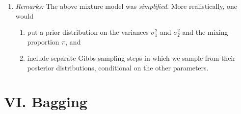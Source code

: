 \documentclass[12pt]{article}
\begin{document}
\begin{enumerate}[label=\textbf{\arabic*.}]
\begin{enumerate}
		\item \textit{Remarks:} The above mixture model was \emph{simplified}. More realistically, one would 
		\begin{enumerate}
			\item put a prior distribution on the variances $\sigma_1^2$ and $\sigma_2^2$ and the mixing proportion $\pi$, and 
			\item include separate Gibbs sampling steps in which we sample from their posterior distributions, conditional on the other parameters. 
		\end{enumerate}
	\end{enumerate}

\end{enumerate}


\section*{VI. Bagging}
\end{document}
